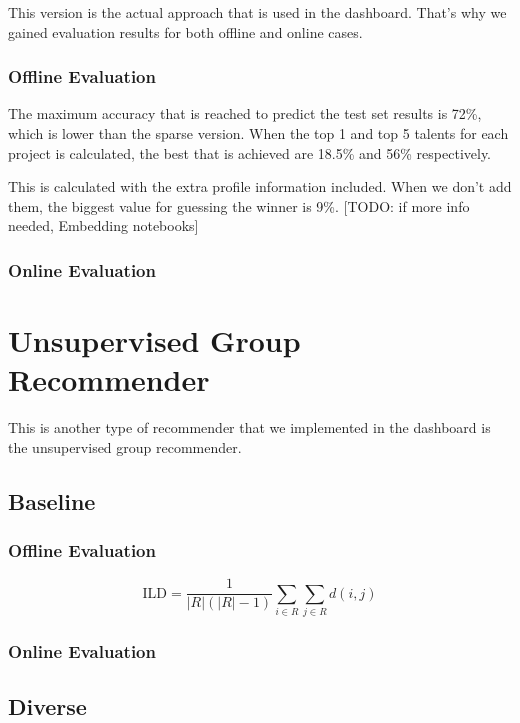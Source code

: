 This version is the actual approach that is used in the dashboard. That's why we gained evaluation results for both offline and online cases. 

\subsubsection{Offline Evaluation}

The maximum accuracy that is reached to predict the test set results is 72\%, which is lower than the sparse version. When the top 1 and top 5 talents for each project is calculated, the best that is achieved are 18.5\% and 56\% respectively. 

This is calculated with the extra profile information included. When we don't add them, the biggest value for guessing the winner is 9\%. [TODO: if more info needed, Embedding notebooks]

\subsubsection{Online Evaluation}

\section{Unsupervised Group Recommender}

This is another type of recommender that we implemented in the dashboard is the unsupervised group recommender. 

\subsection{Baseline}

\subsubsection{Offline Evaluation}

\cite{smyth2001similarity}

$$\mathrm { ILD } = \frac { 1 } { | R | ( | R | - 1 ) } \sum _ { i \in R } \sum _ { j \in R } d ( i , j )$$

\subsubsection{Online Evaluation}

\subsection{Diverse}


